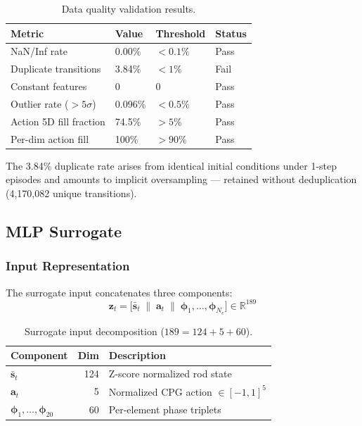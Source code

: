 \documentclass[11pt]{article}
\begin{document}
\begin{table}[H]
  \centering
  \small
  \renewcommand{\arraystretch}{1.3}
  \caption{Data quality validation results.}
  \label{tab:data-quality}
  \begin{tabular}{@{}llll@{}}
    \toprule
    \textbf{Metric} & \textbf{Value} & \textbf{Threshold} & \textbf{Status} \\
    \midrule
    NaN/Inf rate & 0.00\% & $<0.1\%$ & Pass \\
    Duplicate transitions & 3.84\% & $<1\%$ & Fail \\
    Constant features & 0 & 0 & Pass \\
    Outlier rate ($>5\sigma$) & 0.096\% & $<0.5\%$ & Pass \\
    Action 5D fill fraction & 74.5\% & $>5\%$ & Pass \\
    Per-dim action fill & 100\% & $>90\%$ & Pass \\
    \bottomrule
  \end{tabular}
\end{table}

\noindent
The 3.84\% duplicate rate arises from identical initial conditions under 1-step episodes and amounts to implicit oversampling --- retained without deduplication (4,170,082 unique transitions).

\subsection{MLP Surrogate}
\label{sec:surrogate:model}

\subsubsection{Input Representation}
\label{sec:surrogate:model:input}

The surrogate input concatenates three components:
\begin{equation}
  \mathbf{z}_t
    = \bigl[\bar{\mathbf{s}}_t \;\|\; \mathbf{a}_t \;\|\;
            \boldsymbol{\phi}_1, \ldots, \boldsymbol{\phi}_{N_e}\bigr]
    \in \mathbb{R}^{189}
  \label{eq:surrogate-input}
\end{equation}

\begin{table}[H]
  \centering
  \small
  \caption{Surrogate input decomposition ($189 = 124 + 5 + 60$).}
  \label{tab:surrogate-input}
  \begin{tabular}{lrl}
    \toprule
    Component & Dim & Description \\
    \midrule
    $\bar{\mathbf{s}}_t$ & 124 & Z-score normalized rod state \\
    $\mathbf{a}_t$ & 5 & Normalized CPG action $\in [-1,1]^5$ \\
    $\boldsymbol{\phi}_1, \ldots, \boldsymbol{\phi}_{20}$ & 60 & Per-element phase triplets \\
    \bottomrule
  \end{tabular}
\end{table}
\end{document}

